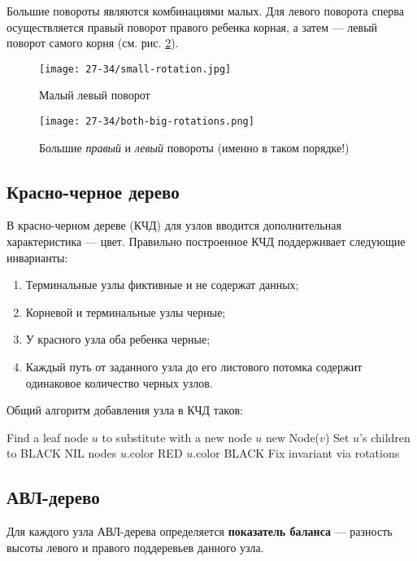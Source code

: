 Большие повороты являются комбинациями малых. Для левого поворота сперва осуществляется правый поворот
правого ребенка корная, а затем --- левый поворот самого корня (см. рис. \ref{fig:big-rotation}).

\begin{figure}
  \begin{center}
  \texttt{[image: 27-34/small-rotation.jpg]}
  \caption{Малый левый поворот}
  \label{fig:small-rotation}
  \end{center}
\end{figure}
\begin{figure}
  \begin{center}
  \texttt{[image: 27-34/both-big-rotations.png]}
  \caption{Большие \textit{правый} и \textit{левый} повороты (именно в таком порядке!)}
  \label{fig:big-rotation}
  \end{center}
\end{figure}

\subsection{Красно-черное дерево}
В красно-черном дереве (КЧД) для узлов вводится дополнительная характеристика --- цвет.
Правильно построенное КЧД поддерживает следующие инварианты:
\begin{enumerate}
  \item Терминальные узлы фиктивные и не содержат данных;
  \item Корневой и терминальные узлы черные;
  \item У красного узла оба ребенка черные;
  \item Каждый путь от заданного узла до его листового потомка содержит одинаковое количество черных узлов.
\end{enumerate}

Общий алгоритм добавления узла в КЧД таков:
\begin{algorithmic}
    \State Find a leaf node $u$ to substitute with a new node
    \State $u$ \asgn new Node($v$)
    \State Set $u$'s children to BLACK NIL nodes
    \State $u$.color \asgn RED
      \State $u$.color \asgn BLACK
      \State Fix invariant via rotations
    \EndIf
  \EndProcedure
\end{algorithmic}
\subsection{АВЛ-дерево}
Для каждого узла АВЛ-дерева определяется \textbf{показатель баланса} --- разность
высоты левого и правого поддеревьев данного узла.

